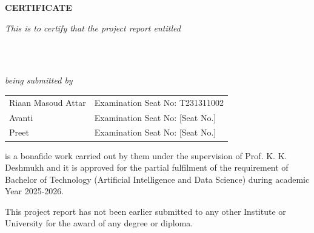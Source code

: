 
\begin{center}

\vspace*{3\baselineskip} 
{\Large \bf{CERTIFICATE}} \\

\end{center}

\vspace{0.4cm}
\centerline{\textit{This is to certify that the project report entitled}}
\vspace*{0.6\baselineskip} 
{\bfseries \fontsize{16}{12} \centering\selectfont{RAP twin}  \\}
\vspace*{0.3\baselineskip}
{\bfseries \fontsize{14}{12} \centering\selectfont{A Digital Twin and Planning Sandbox for Distributed Systems}  \\}
\vspace*{0.6\baselineskip}

\centerline{\textit{being submitted by}}
\vspace*{0.5\baselineskip}

{\large \begin{center}
\begin{tabular}{l l}
Riaan Masoud Attar     & Examination Seat No: T231311002  \\
Avanti                 & Examination Seat No: [Seat No.]  \\
Preet                  & Examination Seat No: [Seat No.]  \\
\end{tabular}
\end{center}}

\vspace*{1.5\baselineskip}
\noindent is a bonafide work carried out by them under the supervision of Prof. K. K. Deshmukh and it is approved for the partial fulfilment of the requirement of Bachelor of Technology (Artificial Intelligence and Data Science) during academic Year 2025-2026.

\vspace*{0.8\baselineskip} 
\noindent This project report has not been earlier submitted to any other Institute or University for the award of any degree or diploma.

\vspace*{3.5\baselineskip} 

